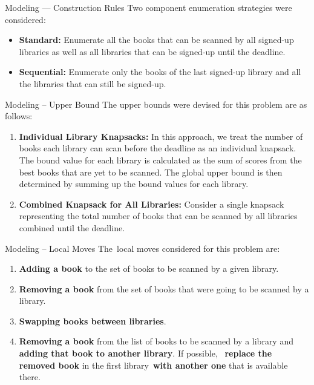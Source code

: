 \begin{frame}{Modeling --- Construction Rules}
  Two component enumeration strategies were considered:
  \begin{itemize}
    \item \textbf{Standard:} Enumerate all the books that can be scanned by all signed-up libraries
          as well as all libraries that can be signed-up until the deadline.
    \item \textbf{Sequential:} Enumerate only the books of the last signed-up library and all the libraries
          that can still be signed-up.
  \end{itemize}
\end{frame}

\begin{frame}{Modeling -- Upper Bound}
  The upper bounds were devised for this problem are as follows:
  \begin{enumerate}
    \item \textbf{Individual Library Knapsacks:} In this approach, we treat the
          number of books each library can scan before the deadline as an individual
          knapsack. The bound value for each library is calculated as the sum of
          scores from the best books that are yet to be scanned. The
          global upper bound is then determined by summing up the bound values for
          each library.

    \item \textbf{Combined Knapsack for All Libraries:} Consider a single
          knapsack representing the total number of books that can be scanned by
          all libraries combined until the deadline.
  \end{enumerate}
\end{frame}

\begin{frame}{Modeling -- Local Moves}
  The~\alert{local moves} considered for this problem are:

  \begin{enumerate}
    \item \textbf{Adding a book} to the set of books to be scanned by a given library.
    \item \textbf{Removing a book} from the set of books that were going to be scanned by a library.
    \item \textbf{Swapping books between libraries}.
    \item \textbf{Removing a book} from the list of books to be scanned by a library and
          \textbf{adding that book to another library}. If possible, ~\textbf{replace the removed book} in
          the first library~\textbf{with another one} that is available there.
  \end{enumerate}
\end{frame}

